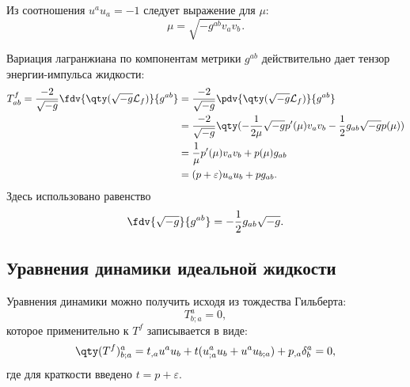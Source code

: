 \documentclass[\docroot/reports/draft/report.tex]{subfiles}
\begin{document}
    Из соотношения $u^a u_a = -1$ следует выражение для $\mu$:
    \begin{equation*}
        \mu = \sqrt{-g^{ab} v_a v_b} .
    \end{equation*}

    Вариация лагранжиана по компонентам метрики $g^{ab}$ действительно дает тензор энергии-импульса жидкости:
    \begin{equation}\begin{aligned}
        T^f_{ab} = \frac{-2}{\sqrt{-g}} \fdv{\qty(\sqrt{-g} \mathcal{L}_f)}{g^{ab}} &=
            \frac{-2}{\sqrt{-g}} \pdv{\qty(\sqrt{-g} \mathcal{L}_f)}{g^{ab}} \\ &=
            \frac{-2}{\sqrt{-g}} \qty(
                - \frac{1}{2 \mu} \sqrt{-g} p'(\mu) v_a v_b - \frac{1}{2} g_{ab} \sqrt{-g} p(\mu)
            ) \\ &=
            \frac{1}{\mu} p'(\mu) v_a v_b + p(\mu) g_{ab} \\ &=
            (p + \varepsilon) u_a u_b + p g_{ab} .
    \end{aligned}\end{equation}
    Здесь использовано равенство
    \begin{equation*}
        \fdv{\sqrt{-g}}{g^{ab}} = - \frac{1}{2} g_{ab} \sqrt{-g} .
    \end{equation*}

\subsection{Уравнения динамики идеальной жидкости}

    Уравнения динамики можно получить исходя из тождества Гильберта:
    \begin{equation}
        T^a_{b;a} = 0 ,
    \end{equation}
    которое применительно к $T^f$ записывается в виде:
    \begin{equation*}
        \qty(T^f)^a_{b;a} = t_{,a} u^a u_b + t (u^a_{;a} u_b + u^a u_{b;a}) + p_{,a} \delta^a_b = 0,
    \end{equation*}
    где для краткости введено $t = p + \varepsilon$.
\end{document}

